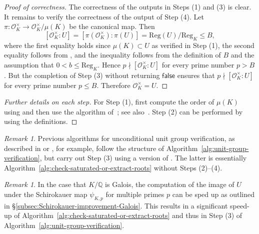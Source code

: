 \documentclass[12pt, a4paper, usenames]{amsart}
\newcommand{\Q}{\mathbb{Q}}
\theoremstyle{plain}
\theoremstyle{remark}
\newtheorem{remark}[theorem]{Remark}
\theoremstyle{definition}
\begin{document}
\begin{proof}[Proof of correctness]
The correctness of the outputs in Steps (1) and (3) is clear.
It remains to verify the correctness of the output of Step (4).
Let $\pi : \mathcal{O}_{K}^{\times} \longrightarrow \mathcal{O}_{K}^{\times}/\mu(K)$
be the canonical map. 
Then
\[
[\mathcal{O}_{K}^{\times} : U] 
= [\pi(\mathcal{O}_{K}^{\times}) : \pi(U)]
= \mathrm{Reg}(U) / \mathrm{Reg}_{K}
\leq B,
\]
where the first equality holds since $\mu(K) \subset U$ as verified in Step (1),
the second equality follows from \cite[Lemma~4.15]{MR1421575}, and the inequality
follows from the definition of $B$ and the assumption that $0<b\leq \mathrm{Reg}_{K}$.
Hence $p \nmid [\mathcal{O}_{K}^{\times}:U]$ for every prime number $p > B$.
But the completion of Step (3) without returning \ensuremath{\mathsf{false}}
ensures that $p \nmid [\mathcal{O}_{K}^{\times}:U]$ for every prime number $p \leq B$.
Therefore $\mathcal{O}_{K}^{\times}=U$.
\end{proof}

\begin{proof}[Further details on each step]
For Step (1), first compute the order of $\mu(K)$ using \cite[Algorithm~4.9.9]{MR1228206}
and then use the algorithm of~\cite{ge}; see also~\cite[Theorem~1.11]{MR3749417}.
Step (2) can be performed by using the definitions. 
\end{proof}

\begin{remark}\label{rmk:previous-unconditional-unit-verification}
Previous algorithms for unconditional unit group verification, as described in 
\cite[\S 4]{MR1273458} or
\cite[\S 6]{10.1145/3815436.3815477}, for example, follow the structure of 
Algorithm~\ref{alg:unit-group-verification}, but carry out Step (3) using a 
version of \cite[Algorithm~4.9]{MR4440537}.
The latter is essentially Algorithm~\ref{alg:check-saturated-or-extract-roots} without
Steps (2)--(4).
\end{remark}

\begin{remark}
In the case that $K/\Q$ is Galois, the computation of the image of $U$
under the Schirokauer map $\psi_{K,p}$ for multiple primes $p$ can be sped up as outlined
in \S \ref{subsec:Schirokauer-improvement-Galois}. 
This results in a significant speed-up of
Algorithm~\ref{alg:check-saturated-or-extract-roots}
and thus in Step (3) of Algorithm~\ref{alg:unit-group-verification}.    
\end{remark}
\end{document}
